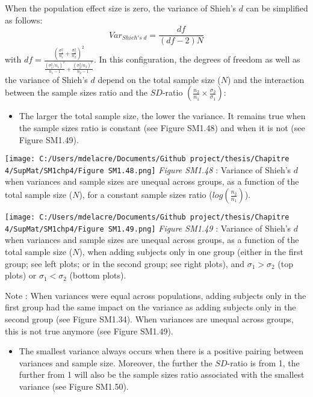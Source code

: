 \documentclass[
  english,
  man,mask,floatsintext]{apa6}
\providecommand{\tightlist}{%
  \setlength{\itemsep}{0pt}\setlength{\parskip}{0pt}}
\begin{document}
When the population effect size is zero, the variance of Shieh's \(d\) can be simplified as follows:
\[Var_{Shieh's \; d} = \frac{df}{(df-2)N}\]
with \(df = \frac{\left(\frac{\sigma^2_1}{n_1}+\frac{\sigma^2_2}{n_2} \right)^2}{\frac{(\sigma^2_1/n_1)^2}{n_1-1}+\frac{(\sigma^2_2/n_2)^2}{n_2-1}}\). In this configuration, the degrees of freedom as well as the variance of Shieh's \(d\) depend on the total sample size (\(N\)) and the interaction between the sample sizes ratio and the \(SD\)-ratio \(\left(\frac{n_2}{n_1}\times\frac{\sigma_2}{\sigma_1} \right)\):

\begin{itemize}
\tightlist
\item
  The larger the total sample size, the lower the variance. It remains true when the sample sizes ratio is constant (see Figure SM1.48) and when it is not (see Figure SM1.49).
\end{itemize}

\texttt{[image: C:/Users/mdelacre/Documents/Github project/thesis/Chapitre 4/SupMat/SM1chp4/Figure SM1.48.png]}
\emph{Figure SM1.48} : Variance of Shieh's \(d\) when variances and sample sizes are unequal across groups, as a function of the total sample size (\(N\)), for a constant sample sizes ratio (\(log\left(\frac{n_2}{n_1} \right)\)).

\texttt{[image: C:/Users/mdelacre/Documents/Github project/thesis/Chapitre 4/SupMat/SM1chp4/Figure SM1.49.png]}
\emph{Figure SM1.49} : Variance of Shieh's \(d\) when variances and sample sizes are unequal across groups, as a function of the total sample size (\(N\)), when adding subjects only in one group (either in the first group; see left plots; or in the second group; see right plots), and \(\sigma_1 > \sigma_2\) (top plots) or \(\sigma_1 < \sigma_2\) (bottom plots).

Note : When variances were equal across populations, adding subjects only in the first group had the same impact on the variance as adding subjects only in the second group (see Figure SM1.34). When variances are unequal across groups, this is not true anymore (see Figure SM1.49).

\newpage

\begin{itemize}
\tightlist
\item
  The smallest variance always occurs when there is a positive pairing between variances and sample size. Moreover, the further the \(SD\)-ratio is from 1, the further from 1 will also be the sample sizes ratio associated with the smallest variance (see Figure SM1.50).
\end{itemize}
\end{document}
